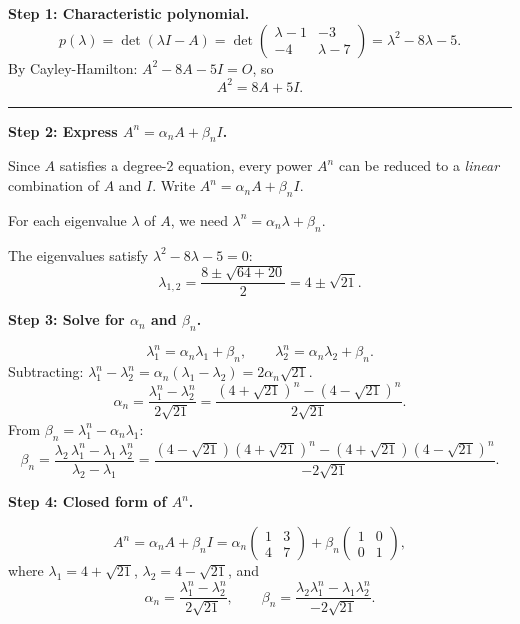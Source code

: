 \documentclass[12pt,a3paper]{article}
\begin{document}
\begin{tcolorbox}[enhanced,breakable,
  colback=cE!4,colframe=cE,boxrule=0.8pt,arc=5pt,
  title={\textbf{Answer --- $A^n$ via Cayley-Hamilton for
    $A=\begin{pmatrix}1&3\\4&7\end{pmatrix}$}},
  fonttitle=\bfseries\color{white},colbacktitle=cE]

\textbf{Step 1: Characteristic polynomial.}
\[
  p(\lambda) = \det(\lambda I - A)
  = \det\begin{pmatrix}\lambda-1&-3\\-4&\lambda-7\end{pmatrix}
  = \lambda^2 - 8\lambda - 5.
\]
By Cayley-Hamilton: $A^2 - 8A - 5I = O$, so
\[
  \boxed{A^2 = 8A + 5I.}
\]

\medskip\textcolor{cE}{\rule{\textwidth}{0.4pt}}

\textbf{Step 2: Express $A^n = \alpha_n A + \beta_n I$.}

Since $A$ satisfies a degree-2 equation, every power $A^n$ can be reduced to a
\emph{linear} combination of $A$ and $I$.  Write $A^n = \alpha_n A + \beta_n I$.

For each eigenvalue $\lambda$ of $A$, we need $\lambda^n = \alpha_n \lambda + \beta_n$.

The eigenvalues satisfy $\lambda^2 - 8\lambda - 5 = 0$:
\[
  \lambda_{1,2} = \frac{8 \pm \sqrt{64+20}}{2} = 4 \pm \sqrt{21}.
\]

\textbf{Step 3: Solve for $\alpha_n$ and $\beta_n$.}

\[
  \lambda_1^n = \alpha_n \lambda_1 + \beta_n, \qquad
  \lambda_2^n = \alpha_n \lambda_2 + \beta_n.
\]
Subtracting: $\lambda_1^n - \lambda_2^n = \alpha_n(\lambda_1 - \lambda_2) = 2\alpha_n\sqrt{21}$.
\[
  \alpha_n = \frac{\lambda_1^n - \lambda_2^n}{2\sqrt{21}}
           = \frac{(4+\sqrt{21})^n - (4-\sqrt{21})^n}{2\sqrt{21}}.
\]
From $\beta_n = \lambda_1^n - \alpha_n\lambda_1$:
\[
  \beta_n = \frac{\lambda_2\,\lambda_1^n - \lambda_1\,\lambda_2^n}{\lambda_2 - \lambda_1}
          = \frac{(4-\sqrt{21})(4+\sqrt{21})^n - (4+\sqrt{21})(4-\sqrt{21})^n}{-2\sqrt{21}}.
\]

\textbf{Step 4: Closed form of $A^n$.}

\[
  \boxed{A^n = \alpha_n A + \beta_n I
  = \alpha_n\begin{pmatrix}1&3\\4&7\end{pmatrix} + \beta_n\begin{pmatrix}1&0\\0&1\end{pmatrix},}
\]
where $\lambda_1 = 4+\sqrt{21}$, $\lambda_2 = 4-\sqrt{21}$, and
\[
  \alpha_n = \frac{\lambda_1^n - \lambda_2^n}{2\sqrt{21}}, \qquad
  \beta_n  = \frac{\lambda_2\lambda_1^n - \lambda_1\lambda_2^n}{-2\sqrt{21}}.
\]


\end{tcolorbox}
\end{document}
